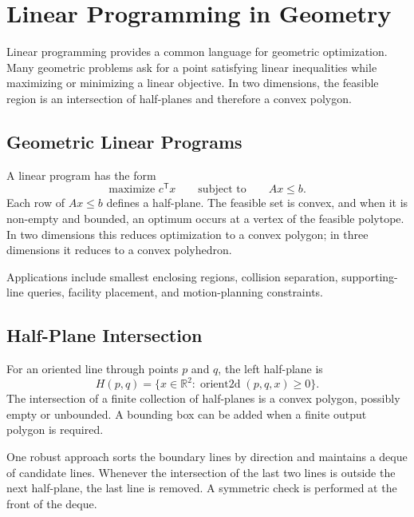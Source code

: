 \chapter{Linear Programming in Geometry}
\label{ch:linear_programming}

Linear programming provides a common language for geometric optimization.
Many geometric problems ask for a point satisfying linear inequalities while
maximizing or minimizing a linear objective. In two dimensions, the feasible
region is an intersection of half-planes and therefore a convex polygon.

\section{Geometric Linear Programs}
\label{sec:geometric_linear_programs}

A linear program has the form
\[
  \text{maximize } c^{\mathsf T}x
  \qquad\text{subject to}\qquad Ax\leq b.
\]
Each row of $Ax\leq b$ defines a half-plane. The feasible set is convex, and
when it is non-empty and bounded, an optimum occurs at a vertex of the
feasible polytope. In two dimensions this reduces optimization to a convex
polygon; in three dimensions it reduces to a convex polyhedron.

Applications include smallest enclosing regions, collision separation,
supporting-line queries, facility placement, and motion-planning constraints.

\section{Half-Plane Intersection}
\label{sec:halfplane_intersection}

For an oriented line through points $p$ and $q$, the left half-plane is
\[
  H(p,q)=\{x\in\mathbb{R}^2:\operatorname{orient2d}(p,q,x)\geq 0\}.
\]
The intersection of a finite collection of half-planes is a convex polygon,
possibly empty or unbounded. A bounding box can be added when a finite output
polygon is required.

One robust approach sorts the boundary lines by direction and maintains a
deque of candidate lines. Whenever the intersection of the last two lines is
outside the next half-plane, the last line is removed. A symmetric check is
performed at the front of the deque.


